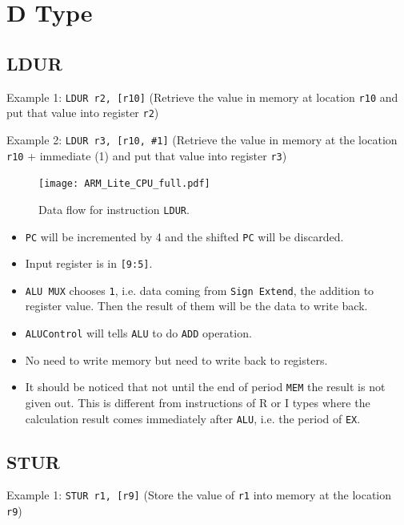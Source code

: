 \documentclass[11pt,fancy,bibstyle=ieee]{elegantbook}
\begin{document}
  \section{D Type}

    \subsection{LDUR}

      Example 1: \texttt{LDUR r2, [r10]} (Retrieve the value in memory at location \texttt{r10} and put that value into register \texttt{r2})

      Example 2: \texttt{LDUR r3, [r10, \#1]} (Retrieve the value in memory at the location \texttt{r10} + immediate (1) and put that value into register \texttt{r3})

      \begin{figure}[htbp]
        \centering
        \texttt{[image: ARM\_Lite\_CPU\_full.pdf]}
        \caption{Data flow for instruction \texttt{LDUR}.}
        \label{fig:CPU_p2}
      \end{figure}

      \begin{itemize}
        \item \texttt{PC} will be incremented by 4 and the shifted \texttt{PC} will be discarded.
        \item Input register is in \texttt{[9:5]}.
        \item \texttt{ALU MUX} chooses \texttt{1}, i.e. data coming from \texttt{Sign Extend}, the addition to register value. Then the result of them will be the data to write back.
        \item \texttt{ALUControl} will tells \texttt{ALU} to do \texttt{ADD} operation.
        \item No need to write memory but need to write back to registers.
        \item It should be noticed that not until the end of period \texttt{MEM} the result is not given out. This is different from instructions of R or I types where the calculation result comes immediately after \texttt{ALU}, i.e. the period of \texttt{EX}.
      \end{itemize}

    \subsection{STUR}

      Example 1: \texttt{STUR r1, [r9]} (Store the value of \texttt{r1} into memory at the location \texttt{r9})
\end{document}
